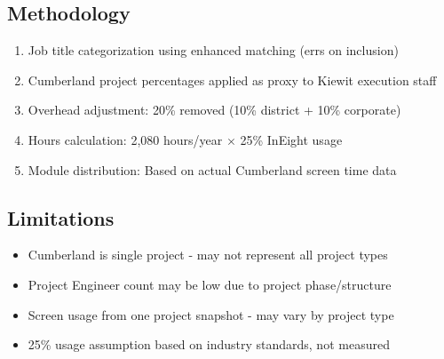 \documentclass[11pt, letterpaper]{article}
\begin{document}
\subsection*{Methodology}
\begin{enumerate}[nosep, leftmargin=2em]
    \item Job title categorization using enhanced matching (errs on inclusion)
    \item Cumberland project percentages applied as proxy to Kiewit execution staff
    \item Overhead adjustment: 20\% removed (10\% district + 10\% corporate)
    \item Hours calculation: 2,080 hours/year $\times$ 25\% InEight usage
    \item Module distribution: Based on actual Cumberland screen time data
\end{enumerate}

\subsection*{Limitations}
\begin{itemize}[nosep, leftmargin=2em]
    \item Cumberland is single project - may not represent all project types
    \item Project Engineer count may be low due to project phase/structure
    \item Screen usage from one project snapshot - may vary by project type
    \item 25\% usage assumption based on industry standards, not measured
\end{itemize}
\end{document}
